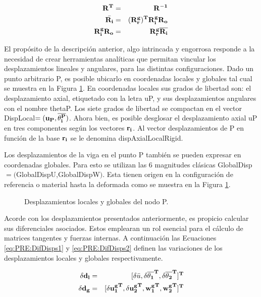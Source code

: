 	\begin{eqnarray}
		\label{eq:PRE:PropOrto}
		\bf{R}^T&=&\bf{R}^{-1}\\
		\label{eq:PRE:Vincul1}
		\bar{\bf{R_i}}&= &(\bf{R_r^g})^T\bf{R_i^g}\bf{R_o}\\
		\label{eq:PRE:Vincul2}
		\bf{R_i^g}\bf{R_o} &=& \bf{R_r^g}\overline{\bf{R_i}}
	\end{eqnarray}


El propósito de la descripción anterior, algo intrincada y engorrosa responde a la necesidad de crear herramientas analíticas que permitan vincular los
desplazamientos lineales y angulares, para las distintas configuraciones. Dado un punto arbitrario P, es posible ubicarlo en coordenadas locales y
globales tal cual se muestra en la Figura \ref{fig:PRE:IlusCorrotDisps}. En coordenadas locales sus grados de libertad son: el desplazamiento axial, etiquetado con la letra \gls{uP}, y sus desplazamientos angulares con el nombre \gls{thetaP}. Los siete grados de libertad se compactan en el vector \gls{DispLocal}$=(\bf{u_P},\bf{\overline{\theta_i^P}})$. Ahora bien, es posible desglosar el desplazamiento axial \gls{uP} en tres componentes según los vectores $\bf{r_i}$. Al vector desplazamientos de P en función de la base  $\bf{r_i}$ se le denomina \gls{dispAxialLocalRigid}.

Los desplazamientos de la viga en el punto P también se pueden expresar en coordenadas globales.  Para esto se utilizan las 6 magnitudes clásicas 
\gls{GlobalDisp}$=($\gls{GlobalDispU},\gls{GlobalDispW}$)$. Esta tienen origen en la configuración de referencia o material hasta la deformada como se muestra en la Figura
\ref{fig:PRE:IlusCorrotDisps}.

\begin{figure}[htbp]
	\centering
	\def\svgwidth{100mm}
	
	\caption{Desplazamientos locales y globales del nodo P.}
	\label{fig:PRE:IlusCorrotDisps}
\end{figure}

Acorde con los desplazamientos presentados anteriormente, es propicio calcular sus diferenciales asociados. Estos emplearan un rol esencial para el cálculo de matrices tangentes y fuerzas internas. A continuación las Ecuaciones \eqref{eq:PRE:DifDisps1} y \eqref{eq:PRE:DifDisps2}
definen las variaciones de los desplazamientos locales y globales respectivamente. 

\begin{eqnarray}\label{eq:PRE:DifDisps1}
		\bf{\delta d_l} &=& [\delta\bar{u}, \bf{\delta\overline{ \theta _1}^T},	\bf{\delta \overline{ \theta _2}^T}]^T\\
	\label{eq:PRE:DifDisps2}
	\bf{\delta d_g} &=& [\bf{\delta u_1^g}^T, \bf{\delta u_2^g}^T, \bf{{w_1^g}^T}, \bf{{w_2^g}^T}]^T
\end{eqnarray}

